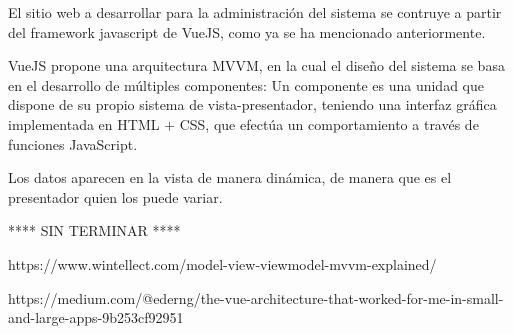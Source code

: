 El sitio web a desarrollar para la administración del sistema se contruye a partir del framework javascript de VueJS, como ya se ha mencionado anteriormente.

VueJS propone una arquitectura MVVM, en la cual el diseño del sistema se basa en el desarrollo de múltiples componentes: Un componente es una unidad que dispone de su propio sistema de vista-presentador, teniendo una interfaz gráfica implementada en HTML + CSS, que efectúa un comportamiento a través de funciones JavaScript.

Los datos aparecen en la vista de manera dinámica, de manera que es el presentador quien los puede variar.


**** SIN TERMINAR ****

https://www.wintellect.com/model-view-viewmodel-mvvm-explained/

https://medium.com/@ederng/the-vue-architecture-that-worked-for-me-in-small-and-large-apps-9b253cf92951
